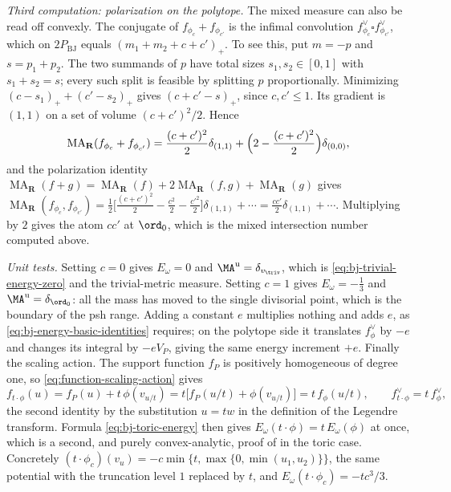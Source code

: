 \begin{example}
\emph{Third computation: polarization on the polytope.}  The mixed measure
can also be read off convexly.  The conjugate of $f_{\phi_c}+f_{\phi_{c'}}$
is the infimal convolution
$f_{\phi_c}^\vee\square f_{\phi_{c'}}^\vee$, which on $2P_{\mathrm{BJ}}$
equals $(m_1+m_2+c+c')_+$. To see this, put $m=-p$ and
$s=p_1+p_2$. The two summands of $p$ have total sizes
$s_1,s_2\in[0,1]$ with $s_1+s_2=s$; every such split is feasible by
splitting $p$ proportionally. Minimizing
$(c-s_1)_++(c'-s_2)_+$ gives $(c+c'-s)_+$, since $c,c'\le1$.
Its gradient is $(1,1)$ on a set of volume
$(c+c')^2/2$.  Hence
\[
 \operatorname{MA}_{\mathbf R}(f_{\phi_c}+f_{\phi_{c'}})
 =\frac{(c+c')^2}{2}\delta_{(1,1)}+\Bigl(2-\frac{(c+c')^2}{2}\Bigr)
   \delta_{(0,0)},
\]
and the polarization identity
$\operatorname{MA}_{\mathbf R}(f+g)=\operatorname{MA}_{\mathbf R}(f)
+2\operatorname{MA}_{\mathbf R}(f,g)+\operatorname{MA}_{\mathbf R}(g)$
gives $\operatorname{MA}_{\mathbf R}(f_{\phi_c},f_{\phi_{c'}})
=\tfrac12\bigl[\tfrac{(c+c')^2}{2}-\tfrac{c^2}{2}-\tfrac{c'^2}{2}\bigr]
\delta_{(1,1)}+\cdots=\tfrac{cc'}{2}\delta_{(1,1)}+\cdots$.  Multiplying
by $2$ gives the atom $cc'$ at $\ord_0$, which is the mixed
intersection number computed above.

\emph{Unit tests.}  Setting $c=0$ gives $E_\omega=0$ and
$\MA^{\mathrm u}=\delta_{v_{\triv}}$, which is
\eqref{eq:bj-trivial-energy-zero} and the trivial-metric measure.  Setting
$c=1$ gives $E_\omega=-\tfrac13$ and
$\MA^{\mathrm u}=\delta_{\ord_0}$: all the mass has moved to the single
divisorial point, which is the boundary of the psh range.  Adding a
constant $e$ multiplies nothing and adds $e$, as
\eqref{eq:bj-energy-basic-identities} requires; on the polytope side it
translates $f_{\phi}^\vee$ by $-e$ and changes its integral by
$-eV_P$, giving the same energy increment $+e$.  Finally the scaling action.  The support
function $f_P$ is positively homogeneous of degree one, so
\eqref{eq:function-scaling-action} gives
\[
 f_{t\cdot\phi}(u)=f_P(u)+t\,\phi(v_{u/t})
 =t\bigl[f_P(u/t)+\phi(v_{u/t})\bigr]
 =t\,f_\phi(u/t),
 \qquad
 f_{t\cdot\phi}^\vee=t\,f_\phi^\vee,
\]
the second identity by the substitution $u=tw$ in the definition of the
Legendre transform.  Formula \eqref{eq:bj-toric-energy} then gives
$E_\omega(t\cdot\phi)=t\,E_\omega(\phi)$ at once, which is a second, and
purely convex-analytic, proof of  in the
toric case.  Concretely
$(t\cdot\phi_c)(v_u)=-c\min\{t,\max\{0,\min(u_1,u_2)\}\}$, the same
potential with the truncation level $1$ replaced by $t$, and
$E_\omega(t\cdot\phi_c)=-tc^3/3$.
\end{example}

